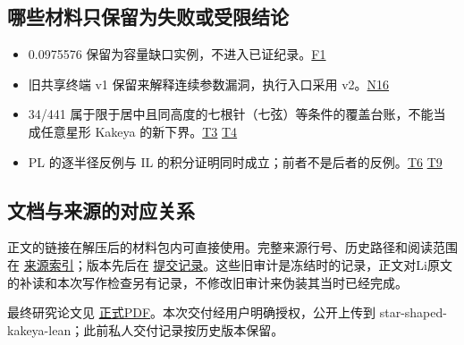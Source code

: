 \subsection{哪些材料只保留为失败或受限结论}\label{ux54eaux4e9bux6750ux6599ux53eaux4fddux7559ux4e3aux5931ux8d25ux6216ux53d7ux9650ux7ed3ux8bba}

\begin{itemize}
\tightlist
\item
  \allowbreak{}0.0975576 保留为容量缺口实例，不进入已证纪录。\href{https://github.com/subfish-zhou/star-shaped-kakeya-lean/blob/6432d8eb33cc2093ed5ca1f5e63390e4bf065fd0/history/blocked-09755/STATUS_BLOCKED.md}{F1}
\item
  旧共享终端 v1 保留来解释连续参数漏洞，执行入口采用 v2。\href{https://github.com/subfish-zhou/star-shaped-kakeya-lean/blob/6432d8eb33cc2093ed5ca1f5e63390e4bf065fd0/history/shared-terminal-082812/class_independent_terminal_strict_report_v2.md}{N16}
\item
  34/441 属于限于居中且同高度的七根针（七弦）等条件的覆盖台账，不能当成任意星形 Kakeya 的新下界。\href{https://github.com/subfish-zhou/star-shaped-kakeya-lean/blob/6432d8eb33cc2093ed5ca1f5e63390e4bf065fd0/history/one-tenth/CLOSEOUT.md}{T3} \href{https://github.com/subfish-zhou/star-shaped-kakeya-lean/blob/6432d8eb33cc2093ed5ca1f5e63390e4bf065fd0/history/one-tenth/DISPOSITION.md}{T4}
\item
  PL 的逐半径反例与 IL 的积分证明同时成立；前者不是后者的反例。\href{https://github.com/subfish-zhou/star-shaped-kakeya-lean/blob/6432d8eb33cc2093ed5ca1f5e63390e4bf065fd0/history/one-tenth/low-source-b2/integrated-low/PROOF.md}{T6} \href{https://github.com/subfish-zhou/star-shaped-kakeya-lean/blob/6432d8eb33cc2093ed5ca1f5e63390e4bf065fd0/history/one-tenth/low-source-b2/paired-pointwise/COUNTEREXAMPLE.md}{T9}
\end{itemize}

\subsection{文档与来源的对应关系}\label{ux6587ux6863ux4e0eux6765ux6e90ux7684ux5bf9ux5e94ux5173ux7cfb}

正文的链接在解压后的材料包内可直接使用。完整来源行号、历史路径和阅读范围在 \href{https://github.com/subfish-zhou/star-shaped-kakeya-lean/blob/6432d8eb33cc2093ed5ca1f5e63390e4bf065fd0/audits/history-source-audit.md}{来源索引}；版本先后在 \href{https://github.com/subfish-zhou/star-shaped-kakeya-lean/blob/6432d8eb33cc2093ed5ca1f5e63390e4bf065fd0/COMMIT_CHRONOLOGY.json}{提交记录}。这些旧审计是冻结时的记录，正文对Li原文的补读和本次写作检查另有记录，不修改旧审计来伪装其当时已经完成。

最终研究论文见 \href{https://github.com/subfish-zhou/star-shaped-kakeya-lean/blob/6432d8eb33cc2093ed5ca1f5e63390e4bf065fd0/final-public/star-shaped-kakeya-paper.pdf}{正式PDF}。本次交付经用户明确授权，公开上传到 star-shaped-kakeya-lean；此前私人交付记录按历史版本保留。

